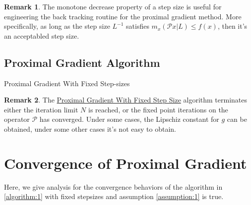 \documentclass[]{article}
\theoremstyle{definition}
\newtheorem{remark}{Remark}[subsection]
{
    \newtheorem{assumption}{Assumption}
}
\begin{document}
        \begin{remark}
            The monotone decrease property of a step size is useful for engineering the back tracking routine for the proximal gradient method. More specifically, as long as the step size $L^{-1}$ satisfies $m_x(\mathcal Px | L)\le f(x)$, then it's an acceptabled step size. 
        \end{remark}
    \subsection{Proximal Gradient Algorithm}
        \begin{algorithm}[h]\label{algorithm:1}
            \label{alg:1}
            \begin{algorithmic}[1]
                \ENDIF
            \ENDFOR
            \end{algorithmic}
            \caption{Proximal Gradient With Fixed Step-sizes}
        \end{algorithm}
        \begin{remark}
            The \hyperref[algorithm:1]{Proximal Gradient With Fixed Step Size} algorithm terminates either the iteration limit $N$ is reached, or the fixed point iterations on the operator $\mathcal P$ has converged. Under some cases, the Lipschiz constant for $g$ can be obtained, under some other cases it's not easy to obtain. 
        \end{remark}

\section{Convergence of Proximal Gradient}
    Here, we give analysis for the convergence behaviors of the algorithm in \hyperref[algorithm:1]{\ref*{algorithm:1}} with fixed stepsizes and assumption \hyperref[assumption:1]{\ref*{assumption:1}} is true. 
\end{document}
